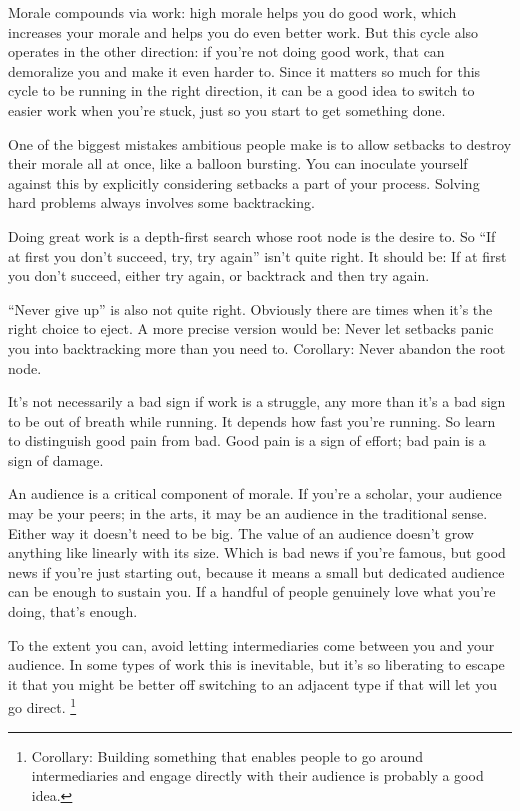 Morale compounds via work: high morale helps you do good work, which
increases your morale and helps you do even better work. But this cycle
also operates in the other direction: if you're not doing good work,
that can demoralize you and make it even harder to. Since it matters so
much for this cycle to be running in the right direction, it can be a
good idea to switch to easier work when you're stuck, just so you start
to get something done.

One of the biggest mistakes ambitious people make is to allow setbacks
to destroy their morale all at once, like a balloon bursting. You can
inoculate yourself against this by explicitly considering setbacks a
part of your process. Solving hard problems always involves some
backtracking.

Doing great work is a depth-first search whose root node is the desire
to. So ``If at first you don't succeed, try, try again'' isn't quite
right. It should be: If at first you don't succeed, either try again, or
backtrack and then try again.

``Never give up'' is also not quite right. Obviously there are times
when it's the right choice to eject. A more precise version would be:
Never let setbacks panic you into backtracking more than you need to.
Corollary: Never abandon the root node.

It's not necessarily a bad sign if work is a struggle, any more than
it's a bad sign to be out of breath while running. It depends how fast
you're running. So learn to distinguish good pain from bad. Good pain is
a sign of effort; bad pain is a sign of damage.

An audience is a critical component of morale. If you're a scholar, your
audience may be your peers; in the arts, it may be an audience in the
traditional sense. Either way it doesn't need to be big. The value of an
audience doesn't grow anything like linearly with its size. Which is bad
news if you're famous, but good news if you're just starting out,
because it means a small but dedicated audience can be enough to sustain
you. If a handful of people genuinely love what you're doing, that's
enough.

To the extent you can, avoid letting intermediaries come between you and
your audience. In some types of work this is inevitable, but it's so
liberating to escape it that you might be better off switching to an
adjacent type if that will let you go direct. \footnote{Corollary: Building something that enables people to go around
intermediaries and engage directly with their audience is probably a
good idea.}

